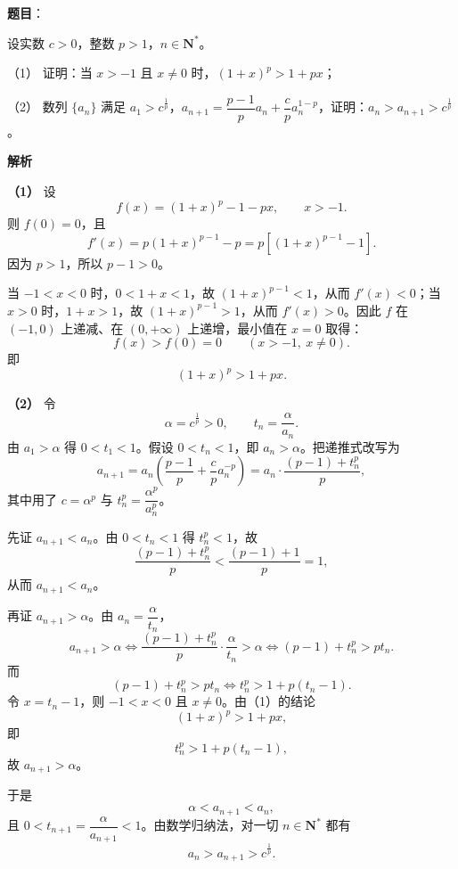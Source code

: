 \begin{answer}

\textbf{题目}：

设实数 $c>0$，整数 $p>1$，$n\in\mathbf N^*$。

（1） 证明：当 $x>-1$ 且 $x\neq0$ 时，$(1+x)^p>1+px$；

（2） 数列 $\{a_n\}$ 满足 $a_1>c^{\frac1p}$，$a_{n+1}=\dfrac{p-1}p a_n+\dfrac cp a_n^{1-p}$，证明：$a_n>a_{n+1}>c^{\frac1p}$。

\textbf{解析}

\textbf{（1）} 设
\nopagebreak[4]
\[f(x)=(1+x)^p-1-px,\qquad x>-1 .\]
则 $f(0)=0$，且
\nopagebreak[4]
\[f'(x)=p(1+x)^{p-1}-p=p\left[(1+x)^{p-1}-1\right].\]
因为 $p>1$，所以 $p-1>0$。

当 $-1<x<0$ 时，$0<1+x<1$，故 $(1+x)^{p-1}<1$，从而 $f'(x)<0$；当 $x>0$ 时，$1+x>1$，故 $(1+x)^{p-1}>1$，从而 $f'(x)>0$。因此 $f$ 在 $(-1,0)$ 上递减、在 $(0,+\infty)$ 上递增，最小值在 $x=0$ 取得：
\nopagebreak[4]
\[f(x)>f(0)=0\qquad (x>-1,\ x\neq0).\]
即
\nopagebreak[4]
\[(1+x)^p>1+px .\]

\textbf{（2）} 令
\nopagebreak[4]
\[\alpha=c^{\frac1p}>0,\qquad t_n=\frac{\alpha}{a_n}.\]
由 $a_1>\alpha$ 得 $0<t_1<1$。假设 $0<t_n<1$，即 $a_n>\alpha$。把递推式改写为
\nopagebreak[4]
\[a_{n+1}=a_n\left(\frac{p-1}p+\frac{c}{p}a_n^{-p}\right)
=a_n\cdot\frac{(p-1)+t_n^p}{p},\]
其中用了 $c=\alpha^p$ 与 $t_n^p=\dfrac{\alpha^p}{a_n^p}$。

先证 $a_{n+1}<a_n$。由 $0<t_n<1$ 得 $t_n^p<1$，故
\nopagebreak[4]
\[\frac{(p-1)+t_n^p}{p}<\frac{(p-1)+1}{p}=1,\]
从而 $a_{n+1}<a_n$。

再证 $a_{n+1}>\alpha$。由 $a_n=\dfrac{\alpha}{t_n}$，
\nopagebreak[4]
\[a_{n+1}>\alpha
\iff \frac{(p-1)+t_n^p}{p}\cdot\frac{\alpha}{t_n}>\alpha
\iff (p-1)+t_n^p>pt_n .\]
而
\nopagebreak[4]
\[(p-1)+t_n^p>pt_n
\iff t_n^p>1+p(t_n-1).\]
令 $x=t_n-1$，则 $-1<x<0$ 且 $x\neq0$。由（1）的结论
\nopagebreak[4]
\[(1+x)^p>1+px,\]
即
\nopagebreak[4]
\[t_n^p>1+p(t_n-1),\]
故 $a_{n+1}>\alpha$。

于是
\nopagebreak[4]
\[\alpha<a_{n+1}<a_n,\]
且 $0<t_{n+1}=\dfrac{\alpha}{a_{n+1}}<1$。由数学归纳法，对一切 $n\in\mathbf N^*$ 都有
\nopagebreak[4]
\[a_n>a_{n+1}>c^{\frac1p}.\]



\end{answer}